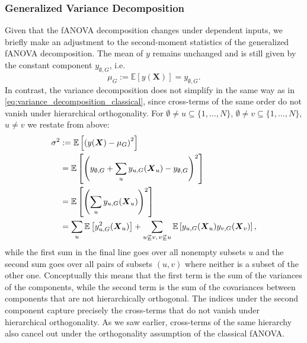\subsubsection{Generalized Variance Decomposition}
Given that the fANOVA decomposition changes under dependent inputs, we briefly make an adjustment to the second-moment statistics of the generalized fANOVA decomposition.
The mean of $y$ remains unchanged and is still given by the constant component \( y_{\emptyset,G} \), i.e.
\[
\mu_G := \mathbb{E}[y(\boldsymbol{X})] = y_{\emptyset,G}.
\]
In contrast, the variance decomposition does not simplify in the same way as in \autoref{eq:variance_decomposition_classical}, since cross-terms of the same order do not vanish under hierarchical orthogonality.
For $ \emptyset \neq u \subseteq \{1,\dots,N\}$, $\emptyset \neq v \subseteq \{1,\dots,N\}$, $u \neq v$ we restate from above:
\begin{align*}
\sigma^2 
&:= \mathbb{E}\left[ \left( y(\boldsymbol{X}) - \mu_G \right)^2 \right] \notag \\
&= \mathbb{E} \left[ \left( y_{\emptyset,G} + \sum_{u} y_{u,G}(\boldsymbol{X}_u) - y_{\emptyset,G} \right)^2 \right] \notag \\
&= \mathbb{E} \left[ \left( \sum_{u} y_{u,G}(\boldsymbol{X}_u) \right)^2 \right] \notag \\
&= \sum_{u} \mathbb{E} \left[ y_{u,G}^2(\boldsymbol{X}_u) \right]
+ \sum_{\substack{u \not\subseteq v,\, v \not\subseteq u}} 
\mathbb{E} \left[ y_{u,G}(\boldsymbol{X}_u) y_{v,G}(\boldsymbol{X}_v) \right],
\end{align*}
while the first sum in the final line goes over all nonempty subsets $u$ and the second sum goes over all pairs of subsets $(u, v)$ where neither is a subset of the other one.
Conceptually this means that the first term is the sum of the variances of the components, while the second term is the sum of the covariances between components that are not hierarchically orthogonal.
The indices under the second component capture precisely the cross-terms that do not vanish under hierarchical orthogonality. As we saw earlier, cross-terms of the same hierarchy also cancel out under the orthogonality assumption of the classical fANOVA.
